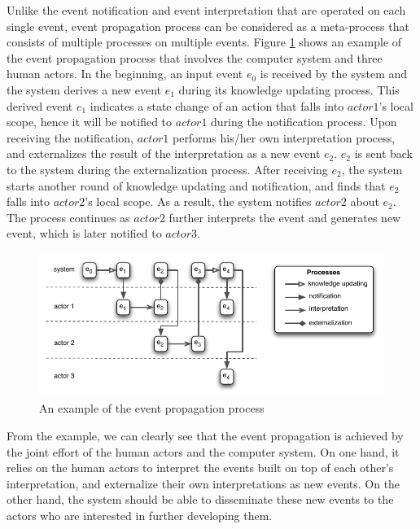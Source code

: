 Unlike the event notification and event interpretation that are operated on each single event, event propagation process can be considered as a meta-process that consists of multiple processes on multiple events. Figure \ref{fig:event_propagation} shows an example of the event propagation process that involves the computer system and three human actors. In the beginning, an input event $e_0$ is received by the system and the system derives a new event $e_1$ during its knowledge updating process. This derived event $e_1$ indicates a state change of an action that falls into $actor 1$'s local scope, hence it will be notified to $actor 1$ during the notification process. Upon receiving the notification, $actor 1$ performs his/her own interpretation process, and externalizes the result of the interpretation as a new event $e_2$. $e_2$ is sent back to the system during the externalization process. After receiving $e_2$, the system starts another round of knowledge updating and notification, and finds that $e_2$ falls into $actor 2$'s local scope. As a result, the system notifies $actor 2$ about $e_2$. The process continues as $actor 2$ further interprets the event and generates new event, which is later notified to $actor 3$.

\begin{figure}[htbp] %
	\centering
	\includegraphics{event_propagation.pdf} 
	\caption{An example of the event propagation process}
	\label{fig:event_propagation}
\end{figure}

From the example, we can clearly see that the event propagation is achieved by the joint effort of the human actors and the computer system. On one hand, it relies on the human actors to interpret the events built on top of each other's interpretation, and externalize their own interpretations as new events. On the other hand, the system should be able to disseminate these new events to the actors who are interested in further developing them.

